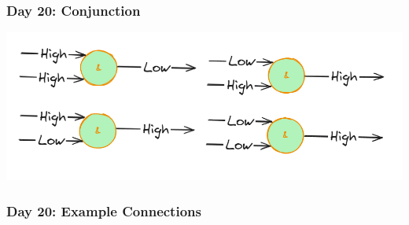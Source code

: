 \begin{frame}
\frametitle{Day 20: Conjunction}

\includegraphics[width=\textwidth]{Day20Conjunction}

\end{frame}

\begin{frame}[fragile]
\frametitle{Day 20: Example Connections}


\end{frame}
